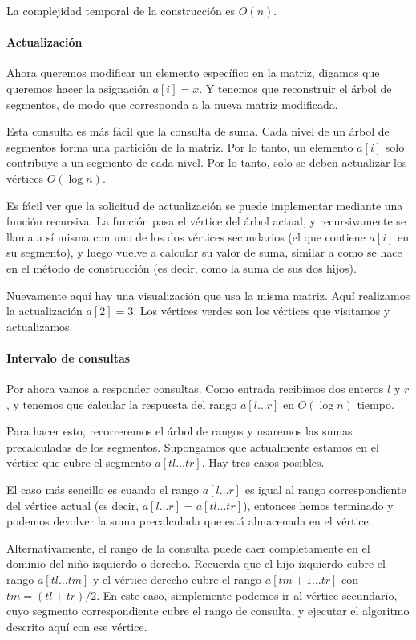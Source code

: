 La complejidad temporal de la construcción es $O(n)$.

\paragraph{Actualización}

Ahora queremos modificar un elemento específico en la matriz, digamos que queremos hacer la asignación $a[i] = x$.
Y tenemos que reconstruir el árbol de segmentos, de modo que corresponda a la nueva matriz modificada.

Esta consulta es más fácil que la consulta de suma. Cada nivel de un árbol de segmentos forma una partición de la matriz.
Por lo tanto, un elemento $a[i]$ solo contribuye a un segmento de cada nivel. Por lo tanto, solo se deben actualizar los vértices $O(\log n)$.

Es fácil ver que la solicitud de actualización se puede implementar mediante una función recursiva.
La función pasa el vértice del árbol actual, y recursivamente se llama a sí misma con uno de los dos vértices secundarios (el que contiene $a[i]$ en su segmento), y luego vuelve a calcular su valor de suma, similar a como se hace en el método de construcción (es decir, como la suma de sus dos hijos).

Nuevamente aquí hay una visualización que usa la misma matriz. Aquí realizamos la actualización $a[2] = 3$. Los vértices verdes son los vértices que visitamos y actualizamos.

\paragraph{Intervalo de consultas}

Por ahora vamos a responder consultas. Como entrada recibimos dos enteros $l$ y $r$, y tenemos que calcular la respuesta del rango $a[l \dots r]$ en $O(\log n)$ tiempo.

Para hacer esto, recorreremos el árbol de rangos y usaremos las sumas precalculadas de los segmentos. Supongamos que actualmente estamos en el vértice que cubre el segmento $a[tl \dots tr]$. Hay tres casos posibles.

El caso más sencillo es cuando el rango $a[l \dots r]$ es igual al rango correspondiente del vértice actual (es decir, $a[l \dots r] = a[tl \dots tr]$), entonces hemos terminado y podemos devolver la suma precalculada que está almacenada en el vértice.

Alternativamente, el rango de la consulta puede caer completamente en el dominio del niño izquierdo o derecho. Recuerda que el hijo izquierdo cubre el rango $a[tl \dots tm]$ y el vértice derecho cubre el rango $a[tm + 1 \dots tr]$ con $tm = (tl + tr) / 2$. En este caso, simplemente podemos ir al vértice secundario, cuyo segmento correspondiente cubre el rango de consulta, y ejecutar el algoritmo descrito aquí con ese vértice.

